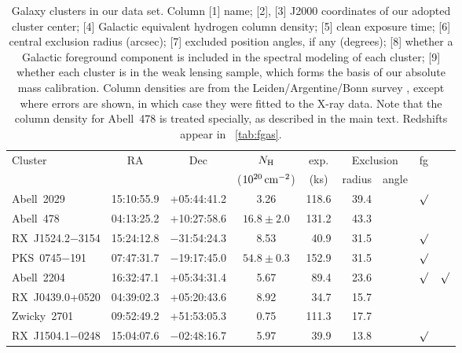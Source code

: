 \begin{table}
  \centering
  \caption{%
    Galaxy clusters in our data set. Column [1] name; 
    [2], [3] J2000 coordinates of our adopted cluster center;
    [4] Galactic equivalent hydrogen column density;
    [5] clean \Chandra{} exposure time;
    [6] central exclusion radius (arcsec);
    [7] excluded position angles, if any (degrees);
    [8] whether a Galactic foreground component is included in the spectral modeling of each cluster;
    [9] whether each cluster is in the \wtg{} weak lensing sample, which forms the basis of our absolute mass calibration.
    Column densities are from the Leiden/Argentine/Bonn survey \citep{Kalberla0504140}, except where errors are shown, in which case they were fitted to the X-ray data. Note that the column density for Abell~478 is treated specially, as described in the main text. Redshifts appear in \tabref~\ref{tab:fgas}.
  }
  \begin{tabular}{lcccrrccc}
    \hline
    \multicolumn{1}{l}{Cluster}  & RA & Dec & $N_{\mathrm{H}}$ & \multicolumn{1}{c}{exp.} & \multicolumn{2}{c}{Exclusion} & fg & \wtg{} \\
    & & & ($10^{20}\mathrm{\, cm}^{-2}$) & \multicolumn{1}{c}{(ks)} & radius & angle \\
    \hline
    Abell~2029           &  15:10:55.9  &  +05:44:41.2    &  3.26          &  118.6  &  39.4  &  ~          & $\surd$ &         \\
    Abell~478            &  04:13:25.2  &  +10:27:58.6    &  $16.8\pm2.0$  &  131.2  &  43.3  &  ~          &         &         \\
    RX~J1524.2$-$3154    &  15:24:12.8  &  $-$31:54:24.3  &  8.53          &  40.9   &  31.5  &  ~          & $\surd$ &         \\
    PKS~0745$-$191       &  07:47:31.7  &  $-$19:17:45.0  &  $54.8\pm0.3$  &  152.9  &  31.5  &  ~          & $\surd$ &         \\
    Abell~2204           &  16:32:47.1  &  +05:34:31.4    &  5.67          &  89.4   &  23.6  &  ~          & $\surd$ & $\surd$ \\
    RX~J0439.0+0520      &  04:39:02.3  &  +05:20:43.6    &  8.92          &  34.7   &  15.7  &  ~          &         &         \\
    Zwicky~2701          &  09:52:49.2  &  +51:53:05.3    &  0.75          &  111.3  &  17.7  &  ~          &         &         \\
    RX~J1504.1$-$0248    &  15:04:07.6  &  $-$02:48:16.7  &  5.97          &  39.9   &  13.8  &  ~          & $\surd$ &         \\

\end{tabular}
\end{table}
